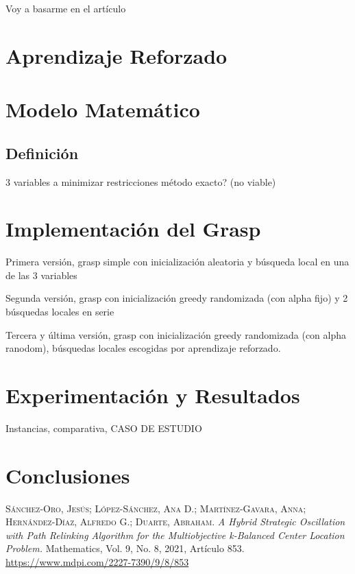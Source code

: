 \documentclass[12pt,a4paper]{book}
\begin{document}
Voy a basarme en el artículo \cite{k-Balanced}



\chapter{Aprendizaje Reforzado}

\chapter{Modelo Matemático}


\section{Definición}
3 variables a minimizar
restricciones
método exacto? (no viable)

\chapter{Implementación del Grasp}

Primera versión, grasp simple con inicialización aleatoria y búsqueda local en una de las 3 variables

Segunda versión, grasp con inicialización greedy randomizada (con alpha fijo) y 2 búsquedas locales en serie

Tercera y última versión, grasp con inicialización greedy randomizada (con alpha ranodom), búsquedas locales escogidas por aprendizaje reforzado.


\chapter{Experimentación y Resultados}

Instancias, comparativa, CASO DE ESTUDIO

\chapter{Conclusiones}





\begin{thebibliography}{X}
     \textsc{Sánchez-Oro, Jesús; López-Sánchez, Ana D.; Martínez-Gavara, Anna; Hernández-Díaz, Alfredo G.; Duarte, Abraham}. \textit{A Hybrid Strategic Oscillation with Path Relinking Algorithm for the Multiobjective k-Balanced Center Location Problem.} Mathematics, Vol. 9, No. 8, 2021, Artículo 853. \url{https://www.mdpi.com/2227-7390/9/8/853}

\end{thebibliography}
\end{document}
